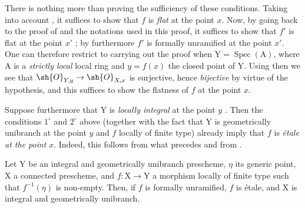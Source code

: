 \begin{remark}[18.10.2]
\begin{enumerate}[label=(\roman*)]
There is nothing more than proving the sufficiency of these conditions.
Taking into account , it suffices to show that $f$ is \emph{flat} at the point $x$.
Now, by going back to the proof of  and the notations used in this proof, it suffices to show that $f'$ is flat at the point $x'$ ; by  furthermore $f'$ is formally unramified at the point $x'$.
One can therefore restrict to carrying out the proof when $\mathrm{Y}=\operatorname{Spec}(\mathrm{A})$, where $\mathrm{A}$ is a \emph{strictly local} local ring and $y=f(x)$ the closed point of $\mathrm{Y}$.
Using then  we see that $\sh{O}_{Y,y}\to\sh{O}_{X,x}$ is surjective, hence \emph{bijective} by virtue of the hypothesis, and this suffices to show the flatness of $f$ at the point $x$.

Suppose furthermore that $\mathrm{Y}$ is \emph{locally integral} at the point $y$ .
Then the conditions $1^{\circ}$ and $2^{\circ}$ above (together with the fact that $\mathrm{Y}$ is geometrically unibranch at the point $y$ and $f$ locally of finite type) already imply that $f$ is \emph{\'etale at the point} $x$.
Indeed, this follows from what precedes and from .
\end{enumerate}
\end{remark}

\begin{corollary}[18.10.3]
\label{IV.18.10.3}
Let $\mathrm{Y}$ be an integral and geometrically unibranch prescheme, $\eta$ its generic point, $\mathrm{X}$ a connected prescheme, and $f:\mathrm{X}\to\mathrm{Y}$ a morphism locally of finite type such that $f^{-1}(\eta)$ is non-empty.
Then, if $f$ is formally unramified, $f$ is \'etale, and $\mathrm{X}$ is integral and geometrically unibranch.
\end{corollary}


